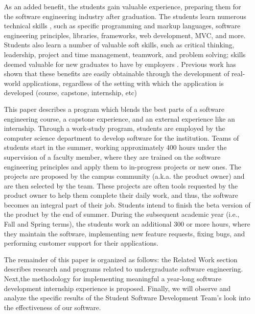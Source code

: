 
As an added benefit, the students gain valuable experience, preparing them for the software engineering industry after graduation. The students learn numerous technical skills \cite{hardskills}, such as specific programming and markup languages, software engineering principles, libraries, frameworks, web development, MVC, and more. Students also learn a number of valuable soft skills, such as critical thinking, leadership, project and time management, teamwork, and problem solving; skills deemed valuable for new graduates to have by employers \cite{lavy2013soft}. Previous work has shown that these benefits are easily obtainable through the development of real-world applications, regardless of the setting with which the application is developed (course, capstone, internship, etc) \cite{heggen2018hiring, liu2005enriching, alzamil2005towards}

This paper describes a program which blends the best parts of a software engineering course, a capstone experience, and an external experience like an internship. Through a work-study program, students are employed by the computer science department to develop software for the institution. Teams of students start in the summer, working approximately 400 hours under the supervision of a faculty member, where they are trained on the software engineering principles and apply them to in-progress projects or new ones. The projects are proposed by the campus community (a.k.a. the product owner) and are then selected by the team. These projects are often tools requested by the product owner to help them complete their daily work, and thus, the software becomes an integral part of their job. Students intend to finish the beta version of the product by the end of summer. During the subsequent academic year (i.e., Fall and Spring terms), the students work an additional 300 or more hours, where they maintain the software, implementing new feature requests, fixing bugs, and performing customer support for their applications. 

The remainder of this paper is organized as follows: the Related Work section describes research and programs related to undergraduate software engineering. Next,the methodology for implementing meaningful a year-long software development internship experience is proposed. Finally, we will observe and analyze the specific results of the Student Software Development Team's look into the effectiveness of our software.
